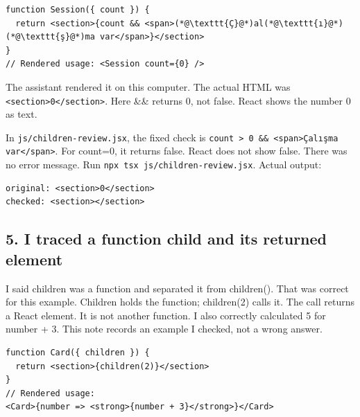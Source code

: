 \documentclass[
  10pt,
  a4paper,
]{article}
\begin{document}
\begin{minipage}{\linewidth}

\begin{lstlisting}
function Session({ count }) {
  return <section>{count && <span>(*@\texttt{Ç}@*)al(*@\texttt{ı}@*)(*@\texttt{ş}@*)ma var</span>}</section>
}
// Rendered usage: <Session count={0} />
\end{lstlisting}

\end{minipage}\par

The assistant rendered it on this computer. The actual HTML was
\texttt{<section>0</\allowbreak{}section>}. Here \&\& returns 0, not
false. React shows the number 0 as text.


In \texttt{js/\allowbreak{}children-review.\allowbreak{}jsx}, the fixed
check is \texttt{count > 0 \&\& <span>Çalışma var</\allowbreak{}span>}.
For count=0, it returns false. React does not show false. There was no
error message. Run
\texttt{npx tsx js/\allowbreak{}children-review.\allowbreak{}jsx}.
Actual output:

\begin{minipage}{\linewidth}

\begin{lstlisting}
original: <section>0</section>
checked: <section></section>
\end{lstlisting}

\end{minipage}\par

\subsection{5. I traced a function child and its returned
element}\label{i-traced-a-function-child-and-its-returned-element}

I said children was a function and separated it from children(). That
was correct for this example. Children holds the function; children(2)
calls it. The call returns a React element. It is not another function.
I also correctly calculated 5 for number + 3. This note records an
example I checked, not a wrong answer.

\begin{minipage}{\linewidth}

\begin{lstlisting}
function Card({ children }) {
  return <section>{children(2)}</section>
}
// Rendered usage:
<Card>{number => <strong>{number + 3}</strong>}</Card>
\end{lstlisting}

\end{minipage}\par
\end{document}
